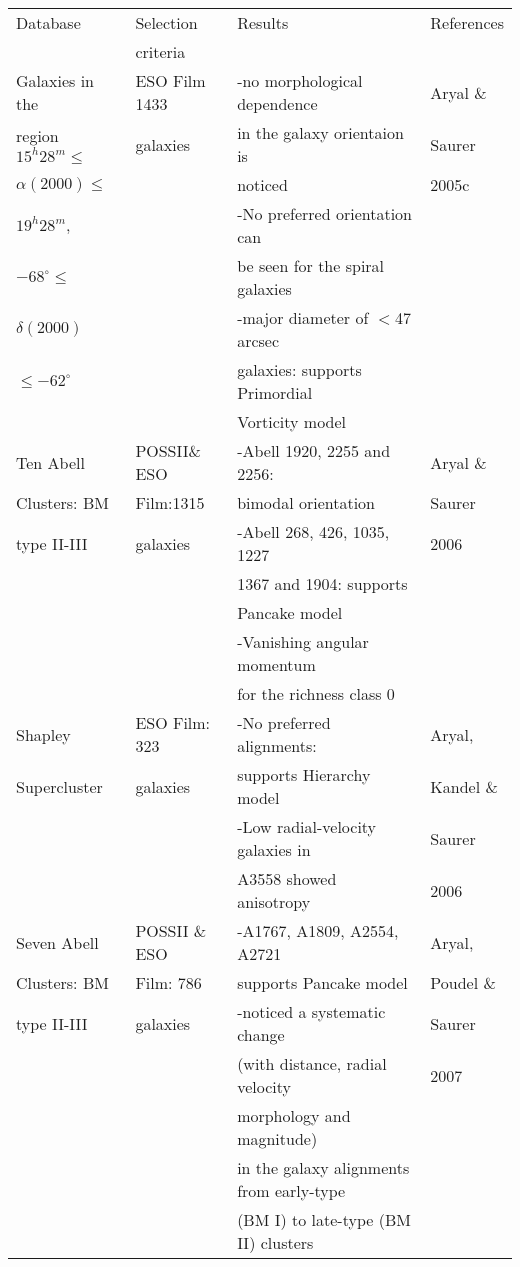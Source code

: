 \begin{center}
\begin{tabular}[lp=7cm]{|l|l|l|l|}
\hline\hline
Database&Selection&Results&References\\
&criteria&&\\
\hline

Galaxies in the		&ESO Film 1433&-no morphological dependence&Aryal \&\\
region $15^h28^m\leq$&galaxies&in the galaxy orientaion is&Saurer\\
$\alpha(2000)\leq$&&noticed&2005c\\
$19^h28^m,$&&-No preferred orientation can&\\
$-68^\circ\leq$&&be seen for the spiral galaxies&\\
$\delta(2000)$&&-major diameter of $<$47 arcsec&\\
$\leq -62^\circ$&&galaxies: supports Primordial&\\
&&Vorticity model&\\
\hline
Ten Abell&POSSII\& ESO&-Abell 1920, 2255 and 2256:&Aryal \&\\
Clusters: BM&Film:1315&bimodal orientation&Saurer \\
type II-III&galaxies&-Abell 268, 426, 1035, 1227&2006\\
&&1367 and 1904: supports&\\
&&Pancake model&\\
&&-Vanishing angular momentum&\\
&&for the richness class 0&\\
\hline
Shapley &ESO Film: 323&-No preferred alignments:&Aryal,\\
Supercluster&galaxies&supports Hierarchy model&Kandel \&\\
&&-Low radial-velocity galaxies in&Saurer\\
&&A3558 showed anisotropy&2006\\
\hline
Seven Abell&POSSII \& ESO&-A1767, A1809, A2554, A2721&Aryal,\\
Clusters: BM&Film: 786&supports Pancake model&Poudel \&\\
type II-III&galaxies&-noticed a systematic change&Saurer\\
&&(with distance, radial velocity&2007\\
&&morphology and magnitude) &\\
&&in the galaxy alignments from early-type&\\
&&(BM I) to late-type (BM II) clusters&\\

\end{tabular}
\end{center}
